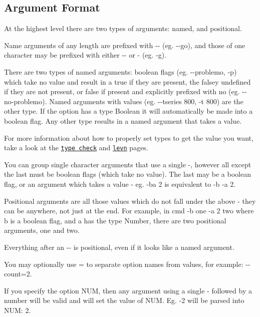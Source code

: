 \subsection*{Argument Format}

At the highest level there are two types of arguments\+: named, and positional.

Name arguments of any length are prefixed with {\ttfamily -\/-\/} (eg. {\ttfamily -\/-\/go}), and those of one character may be prefixed with either {\ttfamily -\/-\/} or {\ttfamily -\/} (eg. {\ttfamily -\/g}).

There are two types of named arguments\+: boolean flags (eg. {\ttfamily -\/-\/problemo}, {\ttfamily -\/p}) which take no value and result in a {\ttfamily true} if they are present, the falsey {\ttfamily undefined} if they are not present, or {\ttfamily false} if present and explicitly prefixed with {\ttfamily no} (eg. {\ttfamily -\/-\/no-\/problemo}). Named arguments with values (eg. {\ttfamily -\/-\/tseries 800}, {\ttfamily -\/t 800}) are the other type. If the option has a type {\ttfamily Boolean} it will automatically be made into a boolean flag. Any other type results in a named argument that takes a value.

For more information about how to properly set types to get the value you want, take a look at the \href{https://github.com/gkz/type-check}{\tt type check} and \href{https://github.com/gkz/levn}{\tt levn} pages.

You can group single character arguments that use a single {\ttfamily -\/}, however all except the last must be boolean flags (which take no value). The last may be a boolean flag, or an argument which takes a value -\/ eg. {\ttfamily -\/ba 2} is equivalent to {\ttfamily -\/b -\/a 2}.

Positional arguments are all those values which do not fall under the above -\/ they can be anywhere, not just at the end. For example, in {\ttfamily cmd -\/b one -\/a 2 two} where {\ttfamily b} is a boolean flag, and {\ttfamily a} has the type {\ttfamily Number}, there are two positional arguments, {\ttfamily one} and {\ttfamily two}.

Everything after an {\ttfamily -\/-\/} is positional, even if it looks like a named argument.

You may optionally use {\ttfamily =} to separate option names from values, for example\+: {\ttfamily -\/-\/count=2}.

If you specify the option {\ttfamily N\+U\+M}, then any argument using a single {\ttfamily -\/} followed by a number will be valid and will set the value of {\ttfamily N\+U\+M}. Eg. {\ttfamily -\/2} will be parsed into {\ttfamily N\+U\+M\+: 2}.

